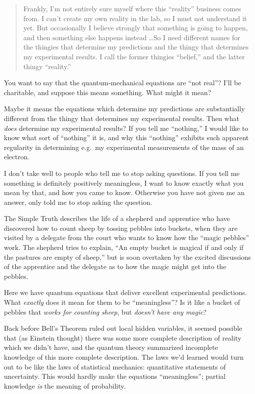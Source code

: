 \begin{quote}
{
 Frankly, I'm not entirely sure myself where this
``reality'' business comes from. I
can't create my own reality in the lab, so I must not
understand it yet. But occasionally I believe strongly that something
is going to happen, and then something else happens instead \ldots So I
need different names for the thingies that determine my predictions and
the thingy that determines my experimental results. I call the former
thingies ``belief,'' and the latter
thingy ``reality.''}
\end{quote}

{
 You want to say that the quantum-mechanical equations are
``not real''? I'll
be charitable, and suppose this means something. What might it mean?}

{
 Maybe it means the equations which determine my predictions are
substantially different from the thingy that determines my experimental
results. Then what \textit{does} determine my experimental results? If
you tell me ``nothing,'' I would
like to know what sort of
``nothing'' it is, and why this
``nothing'' exhibits such apparent
regularity in determining e.g.~my experimental measurements of the mass
of an electron.}

{
 I don't take well to people who tell me to stop
asking questions. If you tell me something is definitely positively
meaningless, I want to know exactly what you mean by that, and how you
came to know. Otherwise you have not given me an answer, only told me
to stop asking the question.}

{
 The Simple Truth describes the life of a shepherd and apprentice
who have discovered how to count sheep by tossing pebbles into buckets,
when they are visited by a delegate from the court who wants to know
how the ``magic pebbles'' work. The
shepherd tries to explain, ``An empty bucket is
magical if and only if the pastures are empty of
sheep,'' but is soon overtaken by the excited
discussions of the apprentice and the delegate as to how the magic
might get into the pebbles.}

{
 Here we have quantum equations that deliver excellent experimental
predictions. What \textit{exactly} does it mean for them to be
``meaningless''? Is it like a bucket
of pebbles that \textit{works for counting sheep}, but
\textit{doesn't have any magic}?}

{
 Back before Bell's Theorem ruled out local hidden
variables, it seemed possible that (as Einstein thought) there was some
more complete description of reality which we didn't
have, and the quantum theory summarized incomplete knowledge of this
more complete description. The laws we'd learned would
turn out to be like the laws of statistical mechanics: quantitative
statements of uncertainty. This would hardly make the equations
``meaningless''; partial knowledge
\textit{is} the meaning of probability.}

